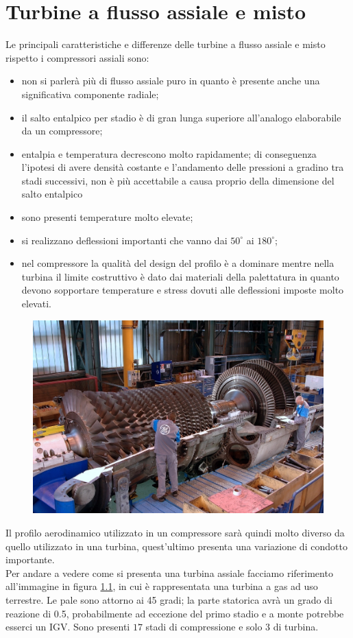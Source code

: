 \chapter{Turbine a flusso assiale e misto}
Le principali caratteristiche e differenze delle turbine a flusso assiale e misto rispetto i compressori assiali sono:
\begin{itemize}
	\item non si parlerà più di flusso assiale puro in quanto è presente anche una significativa componente radiale;
	\item il salto entalpico per stadio è di gran lunga superiore all'analogo elaborabile da un compressore;	
	\item entalpia e temperatura decrescono molto rapidamente; di conseguenza l'ipotesi di avere densità costante e l'andamento delle pressioni a gradino tra stadi successivi, non è più accettabile a causa proprio della dimensione del salto entalpico
	\item sono presenti temperature molto elevate;
	\item si realizzano deflessioni importanti che vanno dai $50^{\circ}$ ai $180^{\circ}$;
	\item nel compressore la qualità del design del profilo è a dominare mentre nella turbina il limite costruttivo è dato dai materiali della palettatura in quanto devono sopportare temperature e stress dovuti alle deflessioni imposte molto elevati.
\end{itemize}
\begin{figure}[h!]
\centering
  \includegraphics[width=.9\textwidth]{fig/TurboGas.png}
\caption{}
\label{fig:TurboGas}
\end{figure}
Il profilo aerodinamico utilizzato in un compressore sarà quindi molto diverso da quello utilizzato in una turbina, quest'ultimo presenta una variazione di condotto importante.\\
Per andare a vedere come si presenta una turbina assiale facciamo riferimento all'immagine in figura \ref{fig:TurboGas}, in cui è rappresentata una turbina a gas ad uso terrestre. Le pale sono attorno ai 45 gradi; la parte statorica avrà un grado di reazione di 0.5, probabilmente ad eccezione del primo stadio e a monte potrebbe esserci un IGV. Sono presenti $17$ stadi di compressione e solo $3$ di turbina. 

